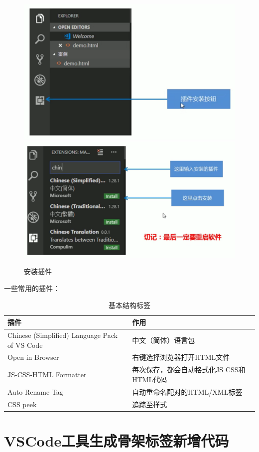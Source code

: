 \documentclass[
]{book}
\begin{document}
\begin{figure}

{\centering \includegraphics[width=0.5\linewidth]{fig/1-4} \includegraphics[width=0.5\linewidth]{fig/1-5} 

}

\caption{安装插件}\label{fig:unnamed-chunk-1}
\end{figure}

一些常用的插件：

\begin{table}

\caption{\label{tab:unnamed-chunk-2}基本结构标签}
\centering
\begin{tabular}[t]{ll}
\toprule
插件 & 作用\\
\midrule
Chinese (Simplified) Language Pack of VS Code & 中文（简体）语言包\\
Open in Browser & 右键选择浏览器打开HTML文件\\
JS-CSS-HTML Formatter & 每次保存，都会自动格式化JS CSS和HTML代码\\
Auto Rename Tag & 自动重命名配对的HTML/XML标签\\
CSS peek & 追踪至样式\\
\bottomrule
\end{tabular}
\end{table}

\hypertarget{vscodeux5de5ux5177ux751fux6210ux9aa8ux67b6ux6807ux7b7eux65b0ux589eux4ee3ux7801}{%
\section{VSCode工具生成骨架标签新增代码}\label{vscodeux5de5ux5177ux751fux6210ux9aa8ux67b6ux6807ux7b7eux65b0ux589eux4ee3ux7801}}
\end{document}
